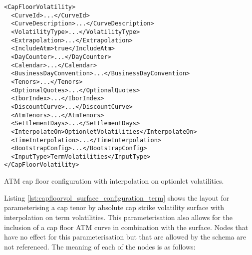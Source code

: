 \begin{longlisting}
\begin{verbatim}
<CapFloorVolatility>
  <CurveId>...</CurveId>
  <CurveDescription>...</CurveDescription>
  <VolatilityType>...</VolatilityType>
  <Extrapolation>...</Extrapolation>
  <IncludeAtm>true</IncludeAtm>
  <DayCounter>...</DayCounter>
  <Calendar>...</Calendar>
  <BusinessDayConvention>...</BusinessDayConvention>
  <Tenors>...</Tenors>
  <OptionalQuotes>...</OptionalQuotes>
  <IborIndex>...</IborIndex>
  <DiscountCurve>...</DiscountCurve>
  <AtmTenors>...</AtmTenors>
  <SettlementDays>...</SettlementDays>
  <InterpolateOn>OptionletVolatilities</InterpolateOn>
  <TimeInterpolation>...</TimeInterpolation>
  <BootstrapConfig>...</BootstrapConfig>
  <InputType>TermVolatilities</InputType>
</CapFloorVolatility>
\end{verbatim}
\caption{ATM cap floor configuration with interpolation on optionlet volatilities.}
\label{lst:capfloorvol_atm_configuration_opt}
\end{longlisting}

Listing \ref{lst:capfloorvol_surface_configuration_term} shows the layout for parameterising a cap tenor by absolute cap strike volatility surface with interpolation on term volatilities. This parameterisation also allows for the inclusion of a cap floor ATM curve in combination with the surface. Nodes that have no effect for this parameterisation but that are allowed by the schema are not referenced. The meaning of each of the nodes is as follows:

